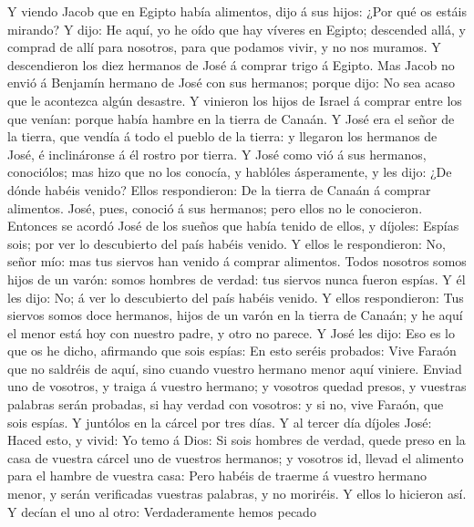  Y viendo Jacob que en Egipto había alimentos, dijo á sus
hijos: ¿Por qué os estáis mirando?  Y dijo: He aquí, yo he
oído que hay víveres en Egipto; descended allá, y comprad de allí para
nosotros, para que podamos vivir, y no nos muramos.  Y
descendieron los diez hermanos de José á comprar trigo á Egipto.
 Mas Jacob no envió á Benjamín hermano de José con sus
hermanos; porque dijo: No sea acaso que le acontezca algún desastre.
 Y vinieron los hijos de Israel á comprar entre los que
venían: porque había hambre en la tierra de Canaán.  Y
José era el señor de la tierra, que vendía á todo el pueblo de la
tierra: y llegaron los hermanos de José, é inclináronse á él rostro por
tierra.  Y José como vió á sus hermanos, conociólos; mas
hizo que no los conocía, y hablóles ásperamente, y les dijo: ¿De dónde
habéis venido? Ellos respondieron: De la tierra de Canaán á comprar
alimentos.  José, pues, conoció á sus hermanos; pero ellos
no le conocieron.  Entonces se acordó José de los sueños
que había tenido de ellos, y díjoles: Espías sois; por ver lo
descubierto del país habéis venido.  Y ellos le
respondieron: No, señor mío: mas tus siervos han venido á comprar
alimentos.  Todos nosotros somos hijos de un varón: somos
hombres de verdad: tus siervos nunca fueron espías.  Y él
les dijo: No; á ver lo descubierto del país habéis venido.
 Y ellos respondieron: Tus siervos somos doce hermanos,
hijos de un varón en la tierra de Canaán; y he aquí el menor está hoy
con nuestro padre, y otro no parece.  Y José les dijo:
Eso es lo que os he dicho, afirmando que sois espías:  En
esto seréis probados: Vive Faraón que no saldréis de aquí, sino cuando
vuestro hermano menor aquí viniere.  Enviad uno de
vosotros, y traiga á vuestro hermano; y vosotros quedad presos, y
vuestras palabras serán probadas, si hay verdad con vosotros: y si no,
vive Faraón, que sois espías.  Y juntólos en la cárcel
por tres días.  Y al tercer día díjoles José: Haced esto,
y vivid: Yo temo á Dios:  Si sois hombres de verdad,
quede preso en la casa de vuestra cárcel uno de vuestros hermanos; y
vosotros id, llevad el alimento para el hambre de vuestra casa:
 Pero habéis de traerme á vuestro hermano menor, y serán
verificadas vuestras palabras, y no moriréis. Y ellos lo hicieron así.
 Y decían el uno al otro: Verdaderamente hemos pecado
